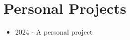 \section{Personal Projects}
  \begin{itemize}[label=\textbf{$\bullet$}]
    \setlength{\itemsep}{-0.25em} %
    \setlength{\itemindent}{-0.5em} %
    \item{2024 - A personal project}
  \end{itemize}
